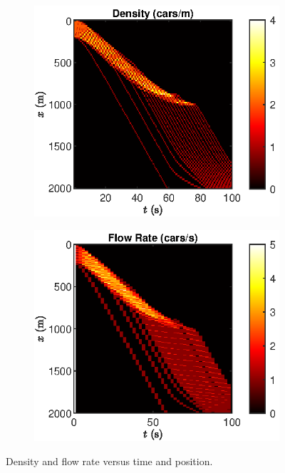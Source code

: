 \documentclass[12pt]{article}
\begin{document}
    \begin{figure}[H]
      \centering
    \begin{subfigure}[H]{.49\textwidth}
      \includegraphics[width=\linewidth]{mlbn_density.eps}
      \centering
    \end{subfigure}
    \begin{subfigure}[H]{.49\textwidth}
      \includegraphics[width=\linewidth]{mlbn_flow.eps}
      \centering
    \end{subfigure}
    \caption{Density and flow rate versus time and position.}
    \label{fig:multi lane density}
    \end{figure}
\end{document}
